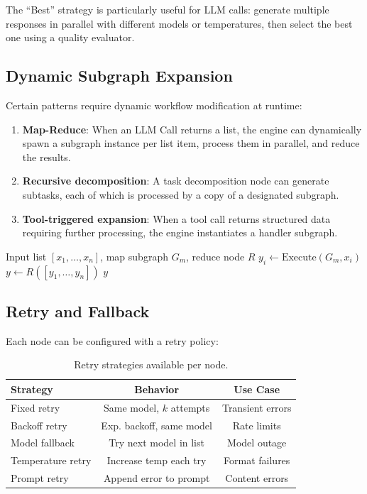 \documentclass[11pt,twocolumn]{article}
\begin{document}
The ``Best'' strategy is particularly useful for LLM calls: generate multiple responses in parallel with different models or temperatures, then select the best one using a quality evaluator.

\subsection{Dynamic Subgraph Expansion}

Certain patterns require dynamic workflow modification at runtime:

\begin{enumerate}[leftmargin=1.4em]
    \item \textbf{Map-Reduce}: When an LLM Call returns a list, the engine can dynamically spawn a subgraph instance per list item, process them in parallel, and reduce the results.
    \item \textbf{Recursive decomposition}: A task decomposition node can generate subtasks, each of which is processed by a copy of a designated subgraph.
    \item \textbf{Tool-triggered expansion}: When a tool call returns structured data requiring further processing, the engine instantiates a handler subgraph.
\end{enumerate}

\begin{algorithm}[H]
\caption{Map-Reduce Expansion}
\label{alg:mapreduce}
\begin{algorithmic}[1]
\Require Input list $[x_1, \ldots, x_n]$, map subgraph $G_m$, reduce node $R$
\State {}
    \State $y_i \gets \text{Execute}(G_m, x_i)$
\EndFor
\State {}
\State $y \gets R([y_1, \ldots, y_n])$
\State \Return $y$
\end{algorithmic}
\end{algorithm}

\subsection{Retry and Fallback}

Each node can be configured with a retry policy:

\begin{table}[H]
\centering
\small
\begin{tabular}{lcc}
\toprule
\textbf{Strategy} & \textbf{Behavior} & \textbf{Use Case} \\
\midrule
Fixed retry & Same model, $k$ attempts & Transient errors \\
Backoff retry & Exp. backoff, same model & Rate limits \\
Model fallback & Try next model in list & Model outage \\
Temperature retry & Increase temp each try & Format failures \\
Prompt retry & Append error to prompt & Content errors \\
\bottomrule
\end{tabular}
\caption{Retry strategies available per node.}
\label{tab:retry}
\end{table}
\end{document}
